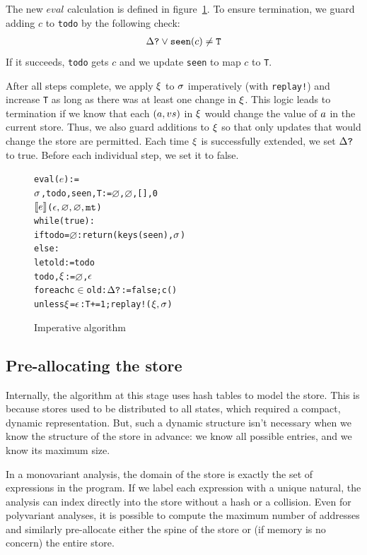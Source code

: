 \documentclass[preprint,onecolumn,9pt]{sigplanconf} %
\begin{document}
The new $eval$ calculation is defined in
figure~\ref{fig:imperative}.  To ensure termination, we guard adding
$c$ to {\tt todo} by the following check:
\begin{align*}\Delta\mbox{{\tt ?}} \vee {\tt seen}(c) \neq {\tt T}\end{align*}
If it succeeds, {\tt todo} gets $c$ and we update {\tt seen} to map $c$ to {\tt T}.

After all steps complete, we apply $\xi$ to $\sigma$ imperatively
(with {\tt replay!}) and increase {\tt T} as long as there was at
least one change in $\xi$. This logic leads to termination if we
know that each $(a, v{s})$ in $\xi$ would change
the value of $a$ in the current store. Thus, we also guard
additions to $\xi$ so that only updates that would change the
store are permitted. Each time $\xi$ is successfully extended, we
set $\Delta\mbox{{\tt ?}}$ to true. Before each individual step, we set it
to false.

\begin{figure}
\begin{alltt}
eval(\(e\)) :=
  \(\msto\), todo, seen, T := \(\varnothing\), \(\varnothing\), [], 0
  \(\compile{e}\)(\(\mtcntr, \varnothing, \varnothing, \kmt\))
  while(true):
    if todo = \(\varnothing\): return (keys(seen), \(\msto\))
    else:
      let old := todo
      todo, \(\msdiff\) := \(\varnothing\), \(\mtlst\)
      foreach c \(\in\) old: \(\changep\) := false; c()
      unless \(\msdiff\) = \(\mtlst\): T += 1; replay!(\(\msdiff, \msto\))
\end{alltt}
\caption{Imperative algorithm}
\label{fig:imperative}
\end{figure}

\subsection{Pre-allocating the store}

Internally, the algorithm at this stage uses hash tables to model the store.
%
This is because stores used to be distributed to all states, which
required a compact, dynamic representation.
%
But, such a dynamic structure isn't necessary when we know the
structure of the store in advance: we know all possible entries, and
we know its maximum size.

In a monovariant analysis, the domain of the store is
exactly the set of expressions in the program.
%
If we label each expression with a unique natural, the analysis can
index directly into the store without a hash or a collision.
%
Even for polyvariant analyses, it is possible to compute the maximum
number of addresses and similarly pre-allocate either the spine of the
store or (if memory is no concern) the entire store.
\end{document}
